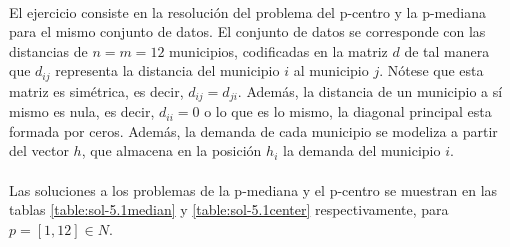 \documentclass[spanish]{article}
\begin{document}
			\paragraph{}
			El ejercicio consiste en la resolución del problema del p-centro y la p-mediana para el mismo conjunto de datos. El conjunto de datos se corresponde con las distancias de $n = m = 12$ municipios, codificadas en la matriz $d$ de tal manera que $d_{ij}$ representa la distancia del municipio $i$ al municipio $j$. Nótese que esta matriz es simétrica, es decir, $d_{ij} = d_{ji}$. Además, la distancia de un municipio a sí mismo es nula, es decir, $d_{ii} = 0$ o lo que es lo mismo, la diagonal principal esta formada por ceros. Además, la demanda de cada municipio se modeliza a partir del vector $h$, que almacena en la posición $h_i$ la demanda del municipio $i$.

			\paragraph{}
			Las soluciones a los problemas de la p-mediana y el p-centro se muestran en las tablas \ref{table:sol-5.1median} y \ref{table:sol-5.1center} respectivamente, para $p = [1, 12] \in N$.
\end{document}
